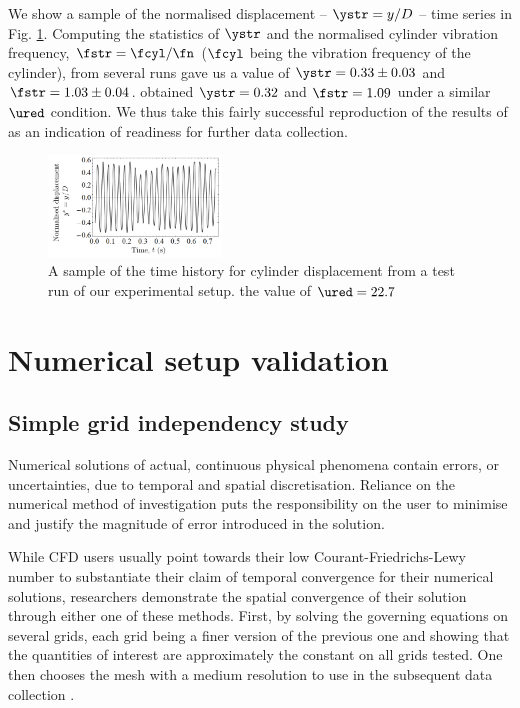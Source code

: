 \documentclass[a4paper,fleqn]{cas-sc}
\begin{document}
We show a sample of the normalised displacement -- $\ystr = y/D$ -- time series in Fig. \ref{fig:sampTimeHist}. Computing the statistics of $\ystr$ and the normalised cylinder vibration frequency, $\fstr = \fcyl/\fn$ ($\fcyl$ being the vibration frequency of the cylinder), from several runs gave us a value of $\ystr = 0.33 \pm 0.03$ and $\fstr = 1.03 \pm 0.04$. \citet{Koide2013} obtained $\ystr = 0.32$  and $\fstr = 1.09$ under a similar $\ured$ condition. We thus take this fairly successful reproduction of the results of \citet{Koide2013} as an indication of readiness for further data collection.

\begin{figure}
  \centering
  \includegraphics[width=0.41\textwidth]{figs/figure5}
  \caption{A sample of the time history for cylinder displacement from a test run of our experimental setup. the value of $\ured = 22.7$}
  \label{fig:sampTimeHist}
\end{figure}

\section{Numerical setup validation} \label{sec:numSetup}
\subsection{Simple grid independency study} \label{ssec:simpGCI}
Numerical solutions of actual, continuous physical phenomena contain errors, or uncertainties, due to temporal and spatial discretisation. Reliance on the numerical method of investigation puts the responsibility on the user to minimise and justify the magnitude of error introduced in the solution.

While CFD users usually point towards their low Courant-Friedrichs-Lewy number to substantiate their claim of temporal convergence for their numerical solutions, researchers demonstrate the spatial convergence of their solution through either one of these methods. First, by solving the governing equations on several grids, each grid being a finer version of the previous one and showing that the quantities of interest are approximately the constant on all grids tested. One then chooses the mesh with a medium resolution to use in the subsequent data collection \citep{Wu2011,Ding2013,Ding2015a,Ding2019}.
\end{document}
